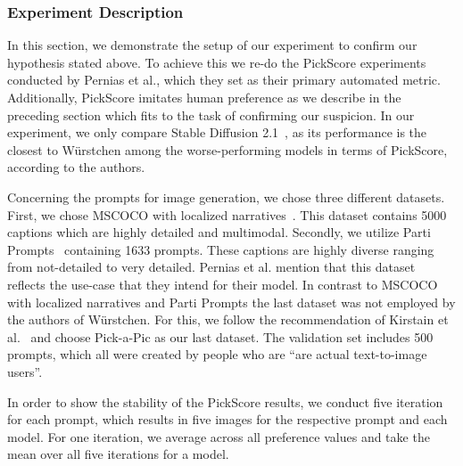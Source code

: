 \subsubsection{Experiment Description}
In this section, we demonstrate the setup of our experiment to confirm our
hypothesis stated above. To achieve this we re-do the PickScore
experiments conducted by Pernias et al., which they set as their primary
automated metric. Additionally, PickScore imitates human preference as we
describe in the preceding section which fits to the task of confirming our
suspicion. In our experiment, we only compare Stable Diffusion
2.1~\cite{rombach2023sd_2_1}, as its performance is the closest to W\"urstchen
among the worse-performing models in terms of PickScore, according to the
authors.

Concerning the prompts for image generation, we chose three different datasets.
First, we chose MSCOCO with localized narratives~\cite{PontTuset2020LocalizedNarratives}.
This dataset contains 5000 captions which are highly detailed and multimodal.
Secondly, we utilize Parti Prompts~\cite{yu2022scalingautoregressivemodelscontentrich}
containing 1633 prompts. These captions are highly diverse ranging from
not-detailed to very detailed. Pernias et al. mention that this dataset reflects
the use-case that they intend for their model. In contrast to MSCOCO with
localized narratives and Parti Prompts the last dataset was not employed by the
authors of W\"urstchen. For this, we follow the recommendation of Kirstain et
al.~\cite{kirstain2023pickapic} and choose Pick-a-Pic as our last dataset. The
validation set includes 500 prompts, which all were created by people who are
``are actual text-to-image users''\cite{kirstain2023pickapic}.

In order to show the stability of the PickScore results, we conduct five
iteration for each prompt, which results in five images for the respective
prompt and each model. For one iteration, we average across all preference
values and take the mean over all five iterations for a model.

